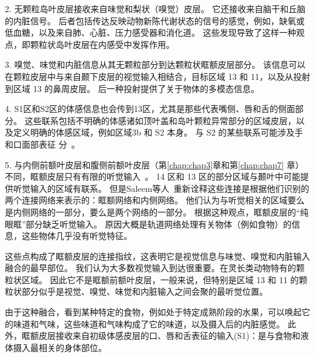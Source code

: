 2. 无颗粒岛叶皮层接收来自味觉和梨状（嗅觉）皮层\cite{carmichael1995sensory}。
它还接收来自脑干和丘脑的内脏信号\cite{ray1992organization}。
后者包括传达反映动物新陈代谢状态的信号的感觉，例如，缺氧或低血糖，以及来自肺、心脏、压力感受器和消化道\cite{craig2002you}。
这些发现导致了这样一种观点，即颗粒状岛叶皮层在内感受中发挥作用。\par


3. 嗅觉、味觉和内脏信息从其无颗粒部分到达颗粒状眶额皮层部分\cite{carmichael1994architectonic}。
该信息可以在颗粒皮层中与来自颞下皮层的视觉输入相结合，目标区域 13 和 11，以及从投射到区域 13 的鼻周皮层\cite{saleem2008complementary}。
后一种投射提供了关于物体的多模态信息\cite{murray2007orbitofrontal}。\par


4. S1区和S2区的体感信息也会传到13区，尤其是那些代表嘴侧\cite{pritchard1986projections}、唇和舌的侧面部分\cite{carmichael1994architectonic}。
这些联系包括不明确的体感诸如顶叶盖和岛叶颗粒异常部分的区域皮层\cite{saleem2008complementary}，以及定义明确的体感区域，例如区域3b 和 S2 本身。
与 S2 的某些联系可能涉及手和口面部表征 分~\cite{carmichael1994architectonic}。\par


5. 与内侧前额叶皮层和腹侧前额叶皮层（第\ref{chap:chap3}章和第\ref{chap:chap7} 章）不同，眶额皮层只有有限的听觉输入~\cite{saleem2008complementary}。
14 区和 13 区的部分区域与颞叶中可能提供听觉输入的区域有联系\cite{petrides1996specialized}。
但是Saleem等人~\cite{saleem2008complementary}重新诠释这些连接是根据他们识别的两个连接网络来表示的：眶额网络和内侧网络。
他们认为与听觉相关的区域要么是内侧网络的一部分，要么是两个网络的一部分。
根据这种观点，眶额皮层的“纯眼眶”部分缺乏听觉输入。
原因大概是轨道网络处理有关物体（例如食物）的信息，这些物体几乎没有听觉特征。\par


这些点构成了眶额皮层的连接指纹，这表明它是视觉信息与味觉、嗅觉和内脏输入融合的最早部位。
我们认为大多数视觉输入到达很重要。在灵长类动物特有的颗粒状区域。
因此它不是眶额前额叶皮层，一般来说，但特别是区域 13 和 11 的颗粒状部分似乎是视觉、嗅觉、味觉和内脏输入之间会聚的最听觉位置。\par


由于这种融合，看到某种特定的食物，例如处于特定成熟阶段的水果，可以唤起它的味道和气味，这些味道和气味构成了它的味道，以及摄入后的内脏感觉。
此外，眶额皮层接收来自初级体感皮层的口、唇和舌表征的输入(S1)：是与食物和液体摄入最相关的身体部位\cite{carmichael1995sensory}。\par


